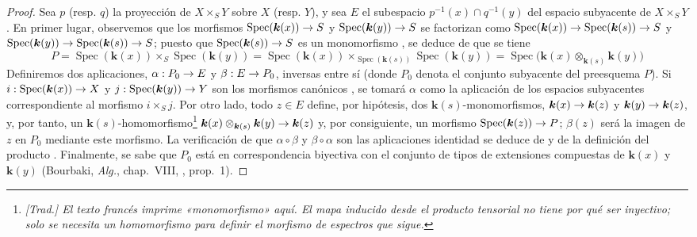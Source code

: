 \documentclass[oneside]{amsart}
\theoremstyle{ega-env-style}
\theoremstyle{ega-thm-env-style}
\theoremstyle{ega-defn-env-style}
\renewcommand{\to}{\mathchoice{\longrightarrow}{\rightarrow}{\rightarrow}{\rightarrow}}
\let\EGAOriginalLabel\label
\renewcommand{\label}[1]{\phantomsection\EGAOriginalLabel{#1}}
\begin{document}
\begin{proof}
Sea $p$ (resp. $q$) la proyección de $X\times_S Y$ sobre $X$ (resp. $Y$), y sea $E$ el subespacio $p^{-1}(x)\cap q^{-1}(y)$ del espacio subyacente de $X\times_S Y$.
En primer lugar, observemos que los morfismos $\operatorname{Spec}(\boldsymbol{k}(x))\to S$ y $\operatorname{Spec}(\boldsymbol{k}(y))\to S$ se factorizan como $\operatorname{Spec}(\boldsymbol{k}(x))\to\operatorname{Spec}(\boldsymbol{k}(s))\to S$ y $\operatorname{Spec}(\boldsymbol{k}(y))\to\operatorname{Spec}(\boldsymbol{k}(s))\to S$; puesto que $\operatorname{Spec}(\boldsymbol{k}(s))\to S$ es un monomorfismo , se deduce de  que se tiene
\label{I.3.4.9.tensor-product-fibre-fr}
\[
  P=\operatorname{Spec}(\boldsymbol{k}(x))\times_S\operatorname{Spec}(\boldsymbol{k}(y))
  =\operatorname{Spec}(\boldsymbol{k}(x))\times_{\operatorname{Spec}(\boldsymbol{k}(s))}
   \operatorname{Spec}(\boldsymbol{k}(y))
  =\operatorname{Spec}\bigl(\boldsymbol{k}(x)\otimes_{\boldsymbol{k}(s)}\boldsymbol{k}(y)\bigr)
\]
Definiremos dos aplicaciones, $\alpha:P_0\to E$ y $\beta:E\to P_0$, inversas entre sí (donde $P_0$ denota el conjunto subyacente del preesquema $P$).
Si $i:\operatorname{Spec}(\boldsymbol{k}(x))\to X$ y $j:\operatorname{Spec}(\boldsymbol{k}(y))\to Y$ son los morfismos canónicos , se tomará $\alpha$ como la aplicación de los espacios subyacentes correspondiente al morfismo $i\times_S j$.
Por otro lado, todo $z\in E$ define, por hipótesis, dos $\boldsymbol{k}(s)$-monomorfismos, $\boldsymbol{k}(x)\to \boldsymbol{k}(z)$ y $\boldsymbol{k}(y)\to \boldsymbol{k}(z)$, y, por tanto, un $\boldsymbol{k}(s)$-homomorfismo\footnote{\emph{[Trad.] El texto francés imprime «monomorfismo» aquí. El mapa inducido desde el producto tensorial no tiene por qué ser inyectivo; solo se necesita un homomorfismo para definir el morfismo de espectros que sigue.}} $\boldsymbol{k}(x)\otimes_{\boldsymbol{k}(s)}\boldsymbol{k}(y)\to \boldsymbol{k}(z)$ y, por consiguiente, un morfismo $\operatorname{Spec}(\boldsymbol{k}(z))\to P$; $\beta(z)$ será la imagen de $z$ en $P_0$ mediante este morfismo.
La verificación de que $\alpha\circ\beta$ y $\beta\circ\alpha$ son las aplicaciones identidad se deduce de  y de la definición del producto .
Finalmente, se sabe que $P_0$ está en correspondencia biyectiva con el conjunto de tipos de extensiones compuestas de $\boldsymbol{k}(x)$ y $\boldsymbol{k}(y)$ (Bourbaki, \emph{Alg.}, chap.~VIII, , prop.~1).
\end{proof}
\end{document}
